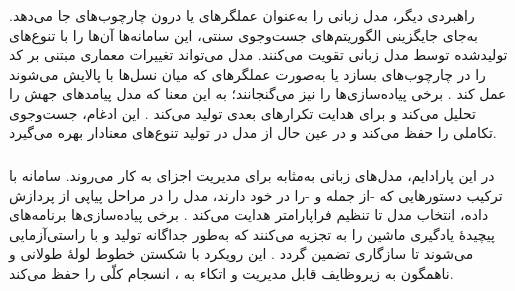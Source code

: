 \subsubsection{\protect{}}
راهبردی دیگر، مدل زبانی را به‌عنوان عملگرهای  یا  درون چارچوب‌های  جا می‌دهد. به‌جای جایگزینی الگوریتم‌های جست‌وجوی سنتی، این سامانه‌ها آن‌ها را با تنوع‌های تولیدشده توسط مدل زبانی تقویت می‌کنند. مدل می‌تواند تغییرات معماری مبتنی بر کد را در چارچوب‌های  بسازد \cite{LLMatic2024} یا به‌صورت عملگرهای  که میان نسل‌ها با  پالایش می‌شوند عمل کند \cite{chen2023Evoprompting}. برخی پیاده‌سازی‌ها  را نیز می‌گنجانند؛ به این معنا که مدل پیامدهای جهش را تحلیل می‌کند و  برای هدایت تکرارهای بعدی تولید می‌کند \cite{ji2025RZNAS}. این ادغام،  جست‌وجوی تکاملی را حفظ می‌کند و در عین حال از  مدل در تولید تنوع‌های معنادار بهره می‌گیرد.

\subsubsection{\protect{}}
در این پارادایم، مدل‌های زبانی به‌مثابه  برای مدیریت اجزای  به کار می‌روند. سامانه با ترکیب دستور‌هایی که -از جمله  و -را در خود دارند، مدل را در مراحل پیاپی از پردازش داده، انتخاب مدل تا تنظیم فراپارامتر هدایت می‌کند \cite{zhang2023AutomlGPTAutomaticMachineLearning, shen2023HuggingGPT}. برخی پیاده‌سازی‌ها برنامه‌های پیچیدهٔ یادگیری ماشین را به  تجزیه می‌کنند که به‌طور جداگانه تولید و با  راستی‌آزمایی می‌شوند تا سازگاری تضمین گردد \cite{xu2024largeTextToML}. این رویکرد با شکستن خطوط لولهٔ طولانی و ناهمگون به زیروظایف قابل مدیریت و اتکاء به ، انسجام کلّی را حفظ می‌کند.

